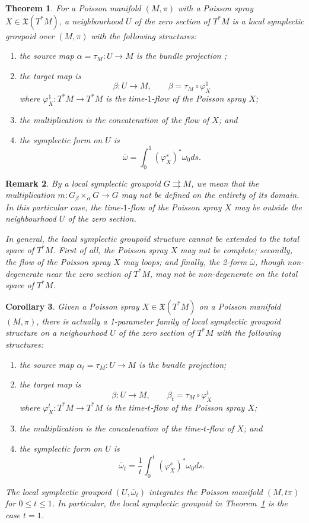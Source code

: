\documentclass{amsart}
\newtheorem{theorem}{Theorem}[section]
\newtheorem{corollary}[theorem]{Corollary}
\newtheorem{remark}[theorem]{Remark}
\begin{document}
\begin{theorem} \cite{MR2900786, CMS17} \label{thm:poissp}
For a Poisson manifold $(M, \pi)$ with a Poisson spray $X \in \mathfrak{X}(T^*M)$, a neighbourhood $U$ of the zero section of $T^*M$ is a local symplectic groupoid over $(M, \pi)$ with the following structures:
	\begin{enumerate}
		\item the source map $\alpha = \tau_M: U \to M$ is the bundle projection ;
		\item the target map is
			$$
				\beta: U \to M, \qquad \beta = \tau_M \circ \varphi_X^1
			$$
		where $\varphi_X^1: T^*M \to T^*M$ is the time-$1$-flow of the Poisson spray $X$;
		\item the multiplication is the concatenation of the flow of $X$; and
		\item the symplectic form on $U$ is
			$$
				\overline{\omega} = \int_{0}^{1} (\varphi_X^s)^*\omega_0 ds.
			$$
	\end{enumerate}
\end{theorem}

\begin{remark}
	By a local symplectic groupoid $G \rightrightarrows M$, we mean that the multiplication $m: G {_\beta \times_\alpha} G \to G$ may not be defined on the entirety of its domain. In this particular case, the time-$1$-flow of the Poisson spray $X$ may be outside the neighbourhood $U$ of the zero section.
	
	In general, the local symplectic groupoid structure cannot be extended to the total space of $T^*M$. First of all, the Poisson spray $X$ may not be complete; secondly, the flow of the Poisson spray $X$ may loops; and finally, the 2-form $\overline{\omega}$, though non-degenerate near the zero section of $T^*M$, may not be non-degenerate on the total space of $T^*M$.
\end{remark}

\begin{corollary}
	Given a Poisson spray $X \in \mathfrak{X}(T^*M)$ on a Poisson manifold $(M, \pi)$, there is actually a 1-parameter family of local symplectic groupoid structure on a neighourhood $U$ of the zero section of $T^*M$ with the following structures:
	\begin{enumerate}
		\item the source map $\alpha_t = \tau_M: U \to M$ is the bundle projection;
		\item the target map is
			$$
				\beta: U \to M, \qquad \beta_t = \tau_M \circ \varphi_X^t
			$$
		where $\varphi_X^t: T^*M \to T^*M$ is the time-$t$-flow of the Poisson spray $X$;
		\item the multiplication is the concatenation of the time-$t$-flow of $X$; and
		\item the symplectic form on $U$ is
			$$
				\overline{\omega}_t = \frac{1}{t}\int_{0}^{t} (\varphi_X^s)^*\omega_0 ds.
			$$
	\end{enumerate}
The local symplectic groupoid $(U, \overline{\omega}_t)$ integrates the Poisson manifold $(M, t\pi)$ for $0 \leq t\leq 1$. In particular, the local symplectic groupoid in Theorem~\ref{thm:poissp} is the case $t = 1$.
\end{corollary}
\end{document}
